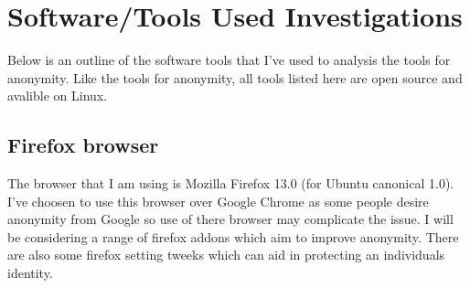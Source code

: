 \documentclass[12pt,a4paper,oneside]{article}
\begin{document}
\section{Software/Tools Used Investigations}
Below is an outline of the software tools that I've used to analysis the tools for anonymity. Like the tools for anonymity, all tools listed here are open source and avalible on Linux. %

\subsection{Firefox browser}
The browser that I am using is Mozilla Firefox 13.0 (for Ubuntu canonical 1.0). I've choosen to use this browser over Google Chrome as some people desire anonymity from Google so use of there browser may complicate the issue. I will be considering a range of firefox addons which aim to improve anonymity. There are also some firefox setting tweeks which can aid in protecting an individuals identity.
\end{document}
